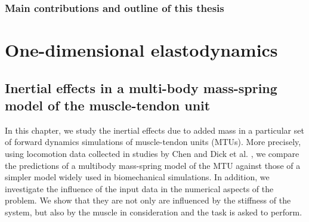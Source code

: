 \documentclass{sfuthesis}
\numberwithin{equation}{section}
\numberwithin{figure}{chapter}
\numberwithin{table}{chapter}
\theoremstyle{definition}
\begin{document}
\section{Main contributions and outline of this thesis}











\part{One-dimensional elastodynamics}

\chapter{Inertial effects in a multi-body mass-spring model of the muscle-tendon unit} \label{ch:mass_enhanced_model}






In this chapter, we study the inertial effects due to added mass in a particular set of forward dynamics simulations of muscle-tendon units (MTUs). More precisely, using locomotion data collected in studies by Chen \cite{EvanThesis} and Dick et al. \cite{Dick2016}, we compare the predictions of a multibody mass-spring model of the MTU against those of a simpler model widely used in biomechanical simulations. In addition, we investigate the influence of the input data in the numerical aspects of the problem. We show that they are not only are influenced by the stiffness of the system, but also by the muscle in consideration and the task is asked to perform.
\end{document}
